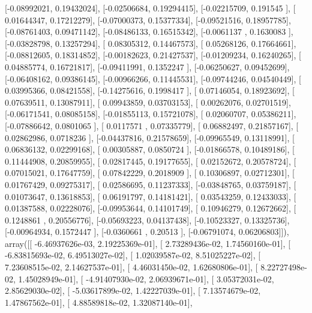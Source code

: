 \documentclass{article}
\begin{document}
       [-0.08992021,  0.19432024],
       [-0.02506684,  0.19294415],
       [-0.02215709,  0.191545  ],
       [ 0.01644347,  0.17212279],
       [-0.07000373,  0.15377334],
       [-0.09521516,  0.18957785],
       [-0.08761403,  0.09471142],
       [-0.08486133,  0.16515342],
       [-0.0061137 ,  0.1630083 ],
       [-0.03828798,  0.13257294],
       [ 0.08305312,  0.14467573],
       [ 0.05268126,  0.17664661],
       [-0.08812605,  0.18314852],
       [-0.00182623,  0.21427537],
       [-0.01209234,  0.16240265],
       [ 0.04885774,  0.16721817],
       [-0.09411991,  0.1352247 ],
       [-0.06250627,  0.09452699],
       [-0.06408162,  0.09386145],
       [-0.00966266,  0.11445531],
       [-0.09744246,  0.04540449],
       [ 0.03995366,  0.08421558],
       [-0.14275616,  0.1998417 ],
       [ 0.07146054,  0.18923692],
       [ 0.07639511,  0.13087911],
       [ 0.09943859,  0.03703153],
       [ 0.00262076,  0.02701519],
       [-0.06171541,  0.08085158],
       [-0.01855113,  0.15721078],
       [ 0.02060707,  0.05386211],
       [-0.07886642,  0.0801065 ],
       [ 0.0117571 ,  0.07335779],
       [ 0.06882497,  0.21857167],
       [ 0.02862986,  0.0718236 ],
       [-0.04437816,  0.21578659],
       [-0.09965549,  0.13118991],
       [ 0.06836132,  0.02299168],
       [ 0.00305887,  0.0850724 ],
       [-0.01866578,  0.10489186],
       [ 0.11444908,  0.20859955],
       [ 0.02817445,  0.19177655],
       [ 0.02152672,  0.20578724],
       [ 0.07015021,  0.17647759],
       [ 0.07842229,  0.2018909 ],
       [ 0.10306897,  0.02712301],
       [ 0.01767429,  0.09275317],
       [ 0.02586695,  0.11237333],
       [-0.03848765,  0.03759187],
       [ 0.01073647,  0.13618853],
       [ 0.06191797,  0.14181421],
       [ 0.03543259,  0.12433033],
       [ 0.01387588,  0.02228076],
       [-0.09953644,  0.14101749],
       [ 0.10946279,  0.12672662],
       [ 0.1248861 ,  0.20556776],
       [-0.05693223,  0.04137438],
       [-0.10523327,  0.13325736],
       [-0.00964934,  0.1572447 ],
       [-0.0360661 ,  0.20513   ],
       [-0.06791074,  0.06206803]]), array([[ -6.46937626e-03,   2.19225369e-01],
       [  2.73289436e-02,   1.74560160e-01],
       [ -6.83815693e-02,   6.49513027e-02],
       [  1.02039587e-02,   8.51025227e-02],
       [  7.23608515e-02,   2.14627537e-01],
       [  4.46031450e-02,   1.62680806e-01],
       [  8.22727498e-02,   1.45028949e-01],
       [ -4.91407930e-02,   2.06939671e-01],
       [  3.05372031e-02,   2.85629030e-02],
       [ -5.03617899e-02,   1.42227039e-01],
       [  7.13574679e-02,   1.47867562e-01],
       [  4.88589818e-02,   1.32087140e-01],
\end{document}
